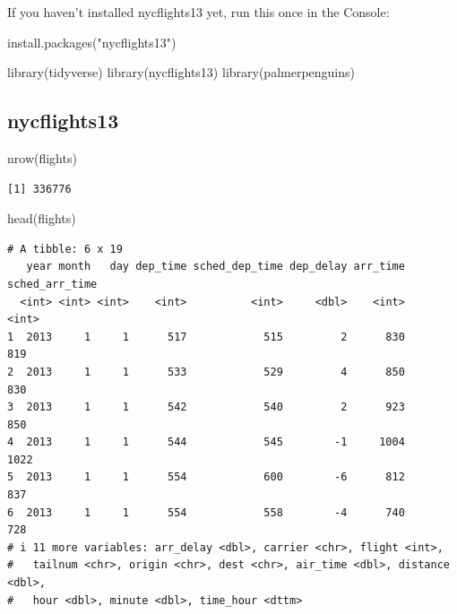 \documentclass[
  letterpaper,
  DIV=11,
  numbers=noendperiod]{scrreprt}
\newenvironment{Shaded}{\begin{snugshade}}{\end{snugshade}}
\newcommand{\FunctionTok}[1]{\textcolor[rgb]{0.28,0.35,0.67}{#1}}
\newcommand{\NormalTok}[1]{\textcolor[rgb]{0.00,0.23,0.31}{#1}}
\newcommand{\StringTok}[1]{\textcolor[rgb]{0.13,0.47,0.30}{#1}}
\begin{document}
If you haven't installed nycflights13 yet, run this once in the Console:

\begin{Shaded}
\begin{Highlighting}[]
\FunctionTok{install.packages}\NormalTok{(}\StringTok{"nycflights13"}\NormalTok{)}
\end{Highlighting}
\end{Shaded}

\begin{Shaded}
\begin{Highlighting}[]
\FunctionTok{library}\NormalTok{(tidyverse)}
\FunctionTok{library}\NormalTok{(nycflights13)}
\FunctionTok{library}\NormalTok{(palmerpenguins)}
\end{Highlighting}
\end{Shaded}

\subsection{nycflights13}\label{nycflights13}

\begin{Shaded}
\begin{Highlighting}[]
\FunctionTok{nrow}\NormalTok{(flights)}
\end{Highlighting}
\end{Shaded}

\begin{verbatim}
[1] 336776
\end{verbatim}

\begin{Shaded}
\begin{Highlighting}[]
\FunctionTok{head}\NormalTok{(flights)}
\end{Highlighting}
\end{Shaded}

\begin{verbatim}
# A tibble: 6 x 19
   year month   day dep_time sched_dep_time dep_delay arr_time sched_arr_time
  <int> <int> <int>    <int>          <int>     <dbl>    <int>          <int>
1  2013     1     1      517            515         2      830            819
2  2013     1     1      533            529         4      850            830
3  2013     1     1      542            540         2      923            850
4  2013     1     1      544            545        -1     1004           1022
5  2013     1     1      554            600        -6      812            837
6  2013     1     1      554            558        -4      740            728
# i 11 more variables: arr_delay <dbl>, carrier <chr>, flight <int>,
#   tailnum <chr>, origin <chr>, dest <chr>, air_time <dbl>, distance <dbl>,
#   hour <dbl>, minute <dbl>, time_hour <dttm>
\end{verbatim}
\end{document}
